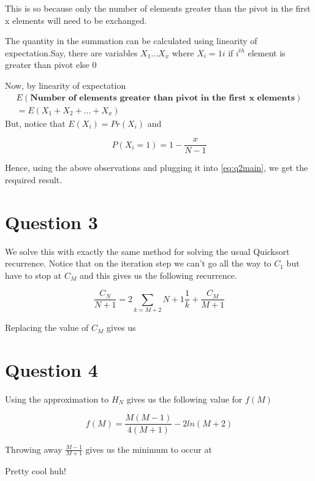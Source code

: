 \documentclass[a4paper,12pt]{article}
\begin{document}
This is so because only the number of elements greater than the pivot in the first x elements will need to be exchanged. 

The quantity in the summation can be calculated using linearity of expectation.Say, there are variables $X_1 \ldots X_x$ where $X_i = 1i$ if $i^{th}$ element is greater than pivot else 0

Now, by linearity of expectation 
\begin{equation}
	\begin{split}
	E(\textbf{Number of elements greater than pivot in the first x elements}) \\
		= E(X_1+X_2+ \ldots + X_x)
	\end{split}
\end{equation}
But, notice that $E(X_i) = Pr(X_i)$ and 

\begin{equation}
	P(X_i = 1) = 1 - \frac{x}{N-1}
\end{equation}

Hence, using the above observations and plugging it into \eqref{eq:q2main}, we get the required result.

\centerline{}

\newpage
\section*{Question 3}
We solve this with exactly the same method for solving the usual Quicksort recurrence. Notice that on the iteration step we can't go all the way to $C_1$ but have to stop at $C_M$ and this gives us the following recurrence. 

\begin{equation}
	\frac{C_N}{N+1} = 2 \sum_{k=M+2}{N+1} \frac{1}{k} + \frac{C_M}{M+1}
\end{equation}

Replacing the value of $C_M$ gives us

\section*{Question 4}
Using the approximation to $H_N$ gives us the following value for $f(M)$

\begin{equation}
	f(M) = \frac{M(M-1)}{4(M+1)} - 2ln(M+2)
\end{equation}

Throwing away $\frac{M-1}{M+1}$ gives us the minimum to occur at 

Pretty cool huh! 
\end{document}
